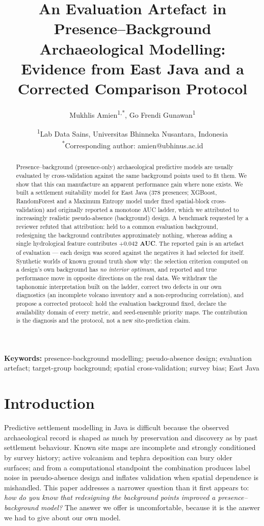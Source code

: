 \documentclass[12pt]{article}
\title{An Evaluation Artefact in Presence--Background Archaeological Modelling:\\
Evidence from East Java and a Corrected Comparison Protocol}
\author{Mukhlis Amien\textsuperscript{1,*}, Go Frendi Gunawan\textsuperscript{1}}
\date{%
\textsuperscript{1}Lab Data Sains, Universitas Bhinneka Nusantara, Indonesia\\
\textsuperscript{*}Corresponding author: amien@ubhinus.ac.id%
}
\begin{document}
\maketitle

\begin{abstract}
\noindent
Presence--background (presence-only) archaeological predictive models are usually evaluated by cross-validation against the same background points used to fit them.
We show that this can manufacture an apparent performance gain where none exists.
We built a settlement suitability model for East Java (378 presences; XGBoost, RandomForest and a Maximum Entropy model under fixed spatial-block cross-validation) and originally reported a monotone AUC ladder, which we attributed to increasingly realistic pseudo-absence (background) design.
A benchmark requested by a reviewer refuted that attribution: held to a common evaluation background, redesigning the background contributes approximately nothing, whereas adding a single hydrological feature contributes \textbf{$+0.042$ AUC}.
The reported gain is an artefact of evaluation --- each design was scored against the negatives it had selected for itself.
Synthetic worlds of known ground truth show why: the selection criterion computed on a design's own background has \emph{no interior optimum}, and reported and true performance move in opposite directions on the real data.
We withdraw the taphonomic interpretation built on the ladder, correct two defects in our own diagnostics (an incomplete volcano inventory and a non-reproducing correlation), and propose a corrected protocol: hold the evaluation background fixed, declare the availability domain of every metric, and seed-ensemble priority maps.
The contribution is the diagnosis and the protocol, not a new site-prediction claim.
\end{abstract}

\noindent\textbf{Keywords:} presence-background modelling; pseudo-absence design; evaluation artefact; target-group background; spatial cross-validation; survey bias; East Java

\section{Introduction}

Predictive settlement modelling in Java is difficult because the observed archaeological record is shaped as much by preservation and discovery as by past settlement behaviour.
Known site maps are incomplete and strongly conditioned by survey history; active volcanism and tephra deposition can bury older surfaces; and from a computational standpoint the combination produces label noise in pseudo-absence design and inflates validation when spatial dependence is mishandled.
This paper addresses a narrower question than it first appears to: \emph{how do you know that redesigning the background points improved a presence--background model?}
The answer we offer is uncomfortable, because it is the answer we had to give about our own model.
\end{document}

